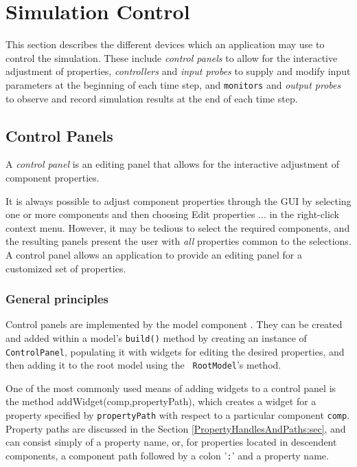 
\section{Simulation Control}
\label{SimulationControl:sec}

This section describes the different devices which an application may
use to control the simulation. These include {\it control panels} to
allow for the interactive adjustment of properties, {\it controllers}
and {\it input probes} to supply and modify input parameters at the
beginning of each time step, and {\tt monitors} and {\it output
probes} to observe and record simulation results at the end of each
time step.

\subsection{Control Panels}

A {\it control panel} is an editing panel that allows for the
interactive adjustment of component properties.

It is always possible to adjust component properties through the GUI
by selecting one or more components and then choosing {\sf Edit
properties ...} in the right-click context menu. However, it may be
tedious to select the required components, and the resulting panels
present the user with {\it all} properties common to the selections.
A control panel allows an application to provide an editing panel for
a customized set of properties.

\subsubsection{General principles}

Control panels are implemented by the model component
. They can be created and
added within a model's {\tt build()} method by creating an instance of
{\tt ControlPanel}, populating it with widgets for editing the desired
properties, and then adding it to the root model using the {\tt
RootModel}'s
method.

One of the most commonly used means of adding widgets to a control
panel is the method
%
{addWidget(comp,propertyPath)}, which creates a widget for a property
specified by {\tt propertyPath} with respect to a particular component
{\tt comp}.  Property paths are discussed in the Section
\ref{PropertyHandlesAndPaths:sec}, and can consist simply of a
property name, or, for properties located in descendent components, a
component path followed by a colon '{\tt :}' and a property name.

